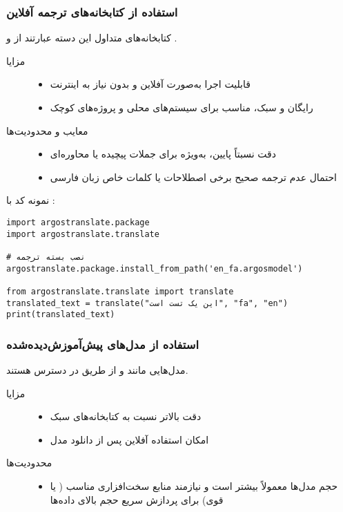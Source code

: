 \documentclass{article}
\begin{document}
\subsubsection{استفاده از کتابخانه‌های ترجمه آفلاین}
کتابخانه‌های متداول این دسته عبارتند از  و .

\begin{description}
\item[مزایا]
\begin{itemize}
\item قابلیت اجرا به‌صورت آفلاین و بدون نیاز به اینترنت
\item رایگان و سبک، مناسب برای سیستم‌های محلی و پروژه‌های کوچک
\end{itemize}
\item[معایب و محدودیت‌ها]
\begin{itemize}
\item دقت نسبتاً پایین، به‌ویژه برای جملات پیچیده یا محاوره‌ای
\item احتمال عدم ترجمه صحیح برخی اصطلاحات یا کلمات خاص زبان فارسی
\end{itemize}
\end{description}

نمونه کد با :
\begin{latin}
\begin{lstlisting}
import argostranslate.package
import argostranslate.translate

# نصب بسته ترجمه
argostranslate.package.install_from_path('en_fa.argosmodel')

from argostranslate.translate import translate
translated_text = translate("این یک تست است", "fa", "en")
print(translated_text)
\end{lstlisting}
\end{latin}

\subsubsection{استفاده از مدل‌های  پیش‌آموزش‌دیده‌شده}
مدل‌هایی مانند  و  از طریق  در دسترس هستند.

\begin{description}
\item[مزایا]
\begin{itemize}
\item دقت بالاتر نسبت به کتابخانه‌های سبک
\item امکان استفاده آفلاین پس از دانلود مدل
\end{itemize}
\item[محدودیت‌ها]
\begin{itemize}
\item حجم مدل‌ها معمولاً بیشتر است و نیازمند منابع سخت‌افزاری مناسب ( یا  قوی) برای پردازش سریع حجم بالای داده‌ها
\end{itemize}
\end{description}
\end{document}
